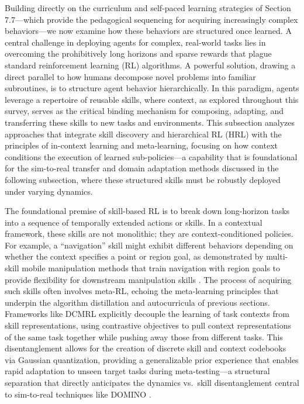 \documentclass[11pt]{article}
\begin{document}
Building directly on the curriculum and self-paced learning strategies of Section 7.7---which provide the pedagogical sequencing for acquiring increasingly complex behaviors---we now examine how these behaviors are structured once learned. A central challenge in deploying agents for complex, real-world tasks lies in overcoming the prohibitively long horizons and sparse rewards that plague standard reinforcement learning (RL) algorithms. A powerful solution, drawing a direct parallel to how humans decompose novel problems into familiar subroutines, is to structure agent behavior hierarchically. In this paradigm, agents leverage a repertoire of reusable skills, where context, as explored throughout this survey, serves as the critical binding mechanism for composing, adapting, and transferring these skills to new tasks and environments. This subsection analyzes approaches that integrate skill discovery and hierarchical RL (HRL) with the principles of in-context learning and meta-learning, focusing on how context conditions the execution of learned sub-policies---a capability that is foundational for the sim-to-real transfer and domain adaptation methods discussed in the following subsection, where these structured skills must be robustly deployed under varying dynamics.

The foundational premise of skill-based RL is to break down long-horizon tasks into a sequence of temporally extended actions or skills. In a contextual framework, these skills are not monolithic; they are context-conditioned policies. For example, a ``navigation'' skill might exhibit different behaviors depending on whether the context specifies a point or region goal, as demonstrated by multi-skill mobile manipulation methods that train navigation with region goals to provide flexibility for downstream manipulation skills \cite{ref382}. The process of acquiring such skills often involves meta-RL, echoing the meta-learning principles that underpin the algorithm distillation and autocurricula of previous sections. Frameworks like DCMRL explicitly decouple the learning of task contexts from skill representations, using contrastive objectives to pull context representations of the same task together while pushing away those from different tasks. This disentanglement allows for the creation of discrete skill and context codebooks via Gaussian quantization, providing a generalizable prior experience that enables rapid adaptation to unseen target tasks during meta-testing---a structural separation that directly anticipates the dynamics vs.~skill disentanglement central to sim-to-real techniques like DOMINO \cite{ref321}.
\end{document}
